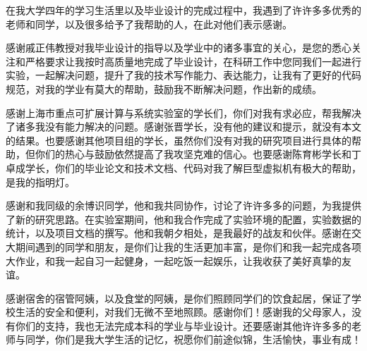 \begin{thanks}
在我大学四年的学习生活里以及毕业设计的完成过程中，我遇到了许许多多优秀的老师和同学，以及很多给予了我帮助的人，在此对他们表示感谢。

感谢戚正伟教授对我毕业设计的指导以及学业中的诸多事宜的关心，是您的悉心关注和严格要求让我按时高质量地完成了毕业设计，在科研工作中您同我们一起进行实验，一起解决问题，提升了我的技术写作能力、表达能力，让我有了更好的代码规范，对我的学业有莫大的帮助，鼓励我不断解决问题，作出新的成绩。

感谢上海市重点可扩展计算与系统实验室的学长们，你们对我有求必应，帮我解决了诸多我没有能力解决的问题。感谢张晋学长，没有他的建议和提示，就没有本文的结果。也要感谢其他项目组的学长，虽然你们没有对我的研究项目进行具体的帮助，但你们的热心与鼓励依然提高了我攻坚克难的信心。也要感谢陈育彬学长和丁卓成学长，你们的毕业论文和技术文档、代码对我了解巨型虚拟机有极大的帮助，是我的指明灯。

感谢和我同级的余博识同学，他和我共同协作，讨论了许许多多的问题，为我提供了新的研究思路。在实验室期间，他和我合作完成了实验环境的配置，实验数据的统计，以及项目文档的撰写。他和我朝夕相处，是我最好的战友和伙伴。感谢在交大期间遇到的同学和朋友，是你们让我的生活更加丰富，是你们和我一起完成各项大作业，和我一起自习一起健身，一起吃饭一起娱乐，让我收获了美好真挚的友谊。

感谢宿舍的宿管阿姨，以及食堂的阿姨，是你们照顾同学们的饮食起居，保证了学校生活的安全和便利，对我们无微不至地照顾。感谢你们！感谢我的父母家人，没有你们的支持，我也无法完成本科的学业与毕业设计。还要感谢其他许许多多的老师与同学，你们是我大学生活的记忆，祝愿你们前途似锦，生活愉快，事业有成！

  

\end{thanks}
